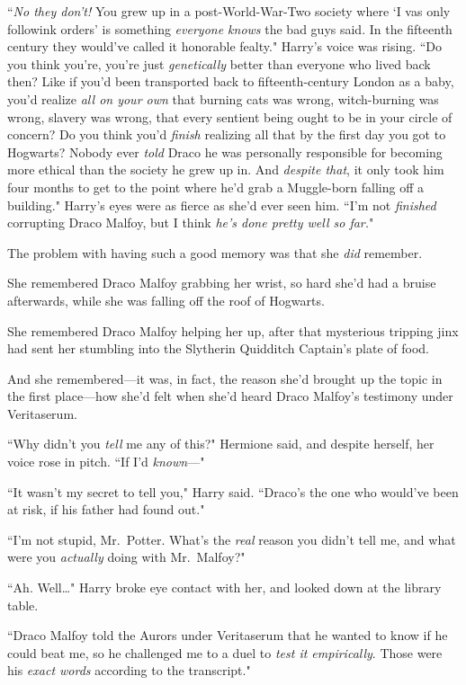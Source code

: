 ``\emph{No they don't!} You grew up in a post-World-War-Two society where `I vas only followink orders' is something \emph{everyone knows} the bad guys said. In the fifteenth century they would've called it honorable fealty." Harry's voice was rising. ``Do you think you're, you're just \emph{genetically} better than everyone who lived back then? Like if you'd been transported back to fifteenth-century London as a baby, you'd realize \emph{all on your own} that burning cats was wrong, witch-burning was wrong, slavery was wrong, that every sentient being ought to be in your circle of concern? Do you think you'd \emph{finish} realizing all that by the first day you got to Hogwarts? Nobody ever \emph{told} Draco he was personally responsible for becoming more ethical than the society he grew up in. And \emph{despite that}, it only took him four months to get to the point where he'd grab a Muggle-born falling off a building." Harry's eyes were as fierce as she'd ever seen him. ``I'm not \emph{finished} corrupting Draco Malfoy, but I think \emph{he's done pretty well so far.}"

The problem with having such a good memory was that she \emph{did} remember.

She remembered Draco Malfoy grabbing her wrist, so hard she'd had a bruise afterwards, while she was falling off the roof of Hogwarts.

She remembered Draco Malfoy helping her up, after that mysterious tripping jinx had sent her stumbling into the Slytherin Quidditch Captain's plate of food.

And she remembered—it was, in fact, the reason she'd brought up the topic in the first place—how she'd felt when she'd heard Draco Malfoy's testimony under Veritaserum.

``Why didn't you \emph{tell} me any of this?" Hermione said, and despite herself, her voice rose in pitch. ``If I'd \emph{known}—"

``It wasn't my secret to tell you," Harry said. ``Draco's the one who would've been at risk, if his father had found out."

``I'm not stupid, Mr.~Potter. What's the \emph{real} reason you didn't tell me, and what were you \emph{actually} doing with Mr.~Malfoy?"

``Ah. Well{\ldots}" Harry broke eye contact with her, and looked down at the library table.

``Draco Malfoy told the Aurors under Veritaserum that he wanted to know if he could beat me, so he challenged me to a duel to \emph{test it empirically}. Those were his \emph{exact words} according to the transcript."

